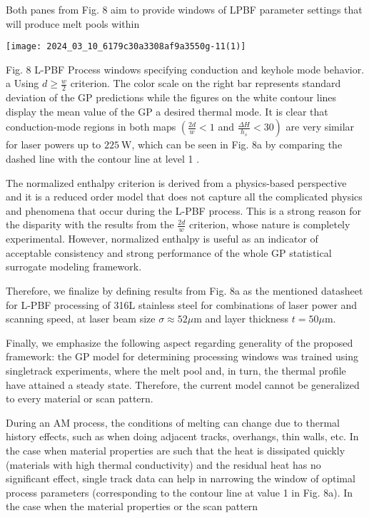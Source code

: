 \documentclass[10pt]{article}
\begin{document}
Both panes from Fig. 8 aim to provide windows of LPBF parameter settings that will produce melt pools within

\begin{center}
\texttt{[image: 2024\_03\_10\_6179c30a3308af9a3550g-11(1)]}
\end{center}

Fig. 8 L-PBF Process windows specifying conduction and keyhole mode behavior. a Using $d \geq \frac{w}{2}$ criterion. The color scale on the right bar represents standard deviation of the GP predictions while the figures on the white contour lines display the mean value of the GP a desired thermal mode. It is clear that conduction-mode regions in both maps $\left(\frac{2 d}{w}<1\right.$ and $\left.\frac{\Delta H}{h_{s}}<30\right)$ are very similar for laser powers up to $225 \mathrm{~W}$, which can be seen in Fig. 8a by comparing the dashed line with the contour line at level 1 .

The normalized enthalpy criterion is derived from a physics-based perspective and it is a reduced order model that does not capture all the complicated physics and phenomena that occur during the L-PBF process. This is a strong reason for the disparity with the results from the $\frac{2 d}{w}$ criterion, whose nature is completely experimental. However, normalized enthalpy is useful as an indicator of acceptable consistency and strong performance of the whole GP statistical surrogate modeling framework.

Therefore, we finalize by defining results from Fig. 8a as the mentioned datasheet for L-PBF processing of 316L stainless steel for combinations of laser power and scanning speed, at laser beam size $\sigma \approx 52 \mu \mathrm{m}$ and layer thickness $t=50 \mu \mathrm{m}$.

Finally, we emphasize the following aspect regarding generality of the proposed framework: the GP model for determining processing windows was trained using singletrack experiments, where the melt pool and, in turn, the thermal profile have attained a steady state. Therefore, the current model cannot be generalized to every material or scan pattern.

During an AM process, the conditions of melting can change due to thermal history effects, such as when doing adjacent tracks, overhangs, thin walls, etc. In the case when material properties are such that the heat is dissipated quickly (materials with high thermal conductivity) and the residual heat has no significant effect, single track data can help in narrowing the window of optimal process parameters (corresponding to the contour line at value 1 in Fig. 8a). In the case when the material properties or the scan pattern
\end{document}
